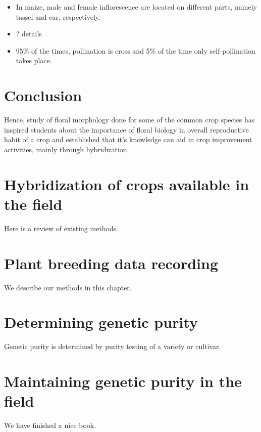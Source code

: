 \documentclass[]{article}
\begin{document}
\begin{itemize}
\item
  In maize, male and female inflorescence are located on different parts, namely tassel and ear, respectively.
\item
  ? details
\item
  95\% of the times, pollination is cross and 5\% of the time only self-pollination takes place.
\end{itemize}

\hypertarget{conclusion}{%
\section{Conclusion}\label{conclusion}}

Hence, study of floral morphology done for some of the common crop species has inspired students about the importance of floral biology in overall reproductive habit of a crop and established that it's knowledge can aid in crop improvement activities, mainly through hybridization.

\hypertarget{practical-2}{%
\section{Hybridization of crops available in the field}\label{practical-2}}

Here is a review of existing methods.

\hypertarget{practical-3}{%
\section{Plant breeding data recording}\label{practical-3}}

We describe our methods in this chapter.

\hypertarget{practical-4}{%
\section{Determining genetic purity}\label{practical-4}}

Genetic purity is determined by purity testing of a variety or cultivar.

\hypertarget{practical-5}{%
\section{Maintaining genetic purity in the field}\label{practical-5}}

We have finished a nice book.
\end{document}
